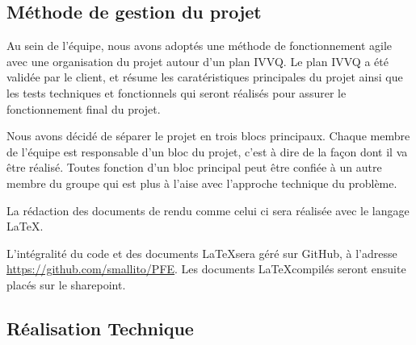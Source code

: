 
\subsection {Méthode de gestion du projet}

Au sein de l'équipe, nous avons adoptés une méthode de fonctionnement agile avec une organisation du projet autour d'un plan IVVQ.
Le plan IVVQ a été validée par le client, et résume les caratéristiques principales du projet ainsi que les tests techniques et fonctionnels qui seront réalisés pour assurer le fonctionnement final du projet.


Nous avons décidé de séparer le projet en trois blocs principaux.
Chaque membre de l'équipe est responsable d'un bloc du projet, c'est à dire de la façon dont il va être réalisé.
Toutes fonction d'un bloc principal peut être confiée à un autre membre du groupe qui est plus à l'aise avec l'approche technique du problème.


La rédaction des documents de rendu comme celui ci sera réalisée avec le langage \LaTeX.


L'intégralité du code et des documents \LaTeX sera géré sur GitHub, à l'adresse \url{https://github.com/smallito/PFE}.
Les documents \LaTeX compilés seront ensuite placés sur le sharepoint.



\subsection {Réalisation Technique}

